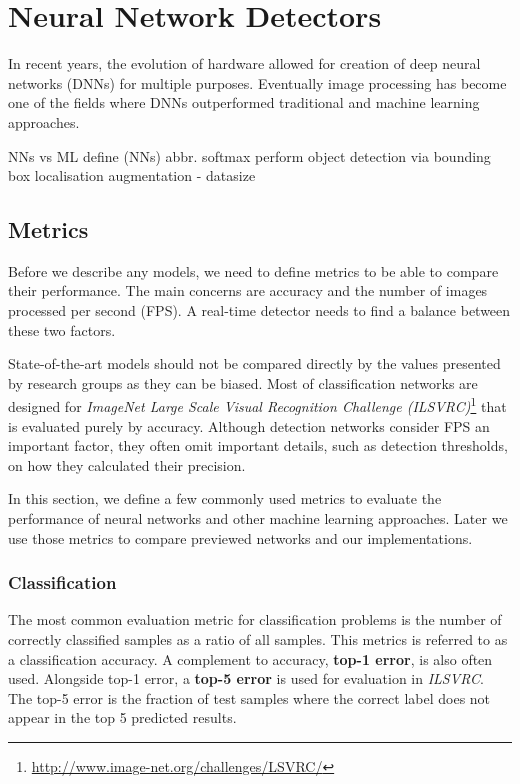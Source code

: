 \chapter{Neural Network Detectors}
In recent years, the evolution of hardware allowed for creation of deep neural networks (DNNs) for multiple purposes. Eventually image processing has become one of the fields where DNNs outperformed traditional and machine learning approaches. 

NNs vs ML
define (NNs) abbr.
softmax
perform object detection via bounding box localisation
augmentation - datasize

\section{Metrics}
Before we describe any models, we need to define metrics to be able to compare their performance. The main concerns are accuracy and the number of images processed per second (FPS). A real-time detector needs to find a balance between these two factors.

State-of-the-art models should not be compared directly by the values presented by research groups as they can be biased. Most of classification networks are designed for \textit{ImageNet Large Scale Visual Recognition Challenge (ILSVRC)}\footnote{\url{http://www.image-net.org/challenges/LSVRC/}} that is evaluated purely by accuracy. Although detection networks consider FPS an important factor, they often omit important details, such as detection thresholds, on how they calculated their precision.

In this section, we define a few commonly used metrics to evaluate the performance of neural networks and other machine learning approaches. Later we use those metrics to compare previewed networks and our implementations.

\subsection*{Classification}
The most common evaluation metric for classification problems is the number of correctly classified samples as a ratio of all samples. This metrics is referred to as a classification accuracy. A complement to accuracy, \textbf{top-1 error}, is also often used. Alongside top-1 error, a \textbf{top-5 error} is used for evaluation in \textit{ILSVRC}. The top-5 error is the fraction of test samples where the correct label does not appear in the top 5 predicted results.

